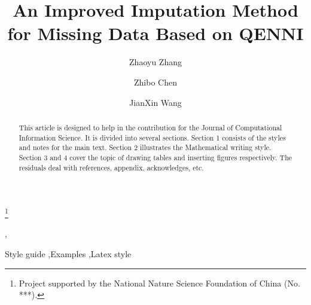 \documentclass[print]{jicspack}
\begin{document}
\begin{premaker}


\title{An Improved Imputation Method for Missing Data Based on QENNI }
\thanks[label1]{Project supported by the National Nature Science Foundation of China (No. ***).}
\author[author1]{Zhaoyu Zhang},
\author[author2]{Zhibo Chen}
\author[author3]{JianXin Wang}

\address[author1]{School of Information Science And Technology, Beijing Forestry University, Beijing 100083, China}
\address[author2]{School of Information Science And Technology, Beijing Forestry University, Beijing 100083, China}
\address[author3]{School of Information Science And Technology, Beijing Forestry University, Beijing 100083, China}

\begin{abstract}
This article is designed to help in the contribution for the Journal of Computational Information Science.
It is divided into several sections.
Section 1 consists of the styles and notes for the main text.
Section 2 illustrates the Mathematical writing style.
Section 3 and 4 cover the topic of drawing tables and inserting figures respectively.
The residuals deal with references, appendix, acknowledges, etc.
\end{abstract}
\begin{keyword}
Style guide \sep Examples \sep Latex style
\end{keyword}
\end{premaker}

\end{document}
